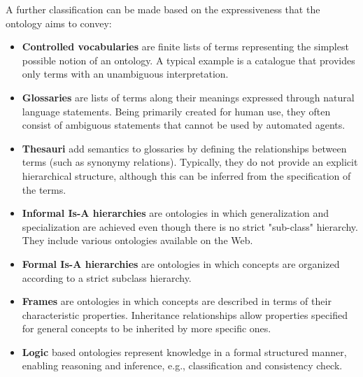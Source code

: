A further classification can be made based on the expressiveness that the ontology aims to convey:
\begin{itemize}
    \item \textbf{Controlled vocabularies} are finite lists of terms representing the simplest possible notion of an ontology. A typical example is a catalogue that provides only terms with an unambiguous interpretation.
    \item \textbf{Glossaries} are lists of terms along their meanings expressed through natural language statements. Being primarily created for human use, they often consist of ambiguous statements that cannot be used by automated agents.
    \item \textbf{Thesauri} add semantics to glossaries by defining the relationships between terms (such as synonymy relations). Typically, they do not provide an explicit hierarchical structure, although this can be inferred from the specification of the terms.
    \item \textbf{Informal Is-A hierarchies} are ontologies in which generalization and specialization are achieved even though there is no strict "sub-class" hierarchy. They include various ontologies available on the Web.
    \item \textbf{Formal Is-A hierarchies} are ontologies in which concepts are organized according to a strict subclass hierarchy.
    \item \textbf{Frames} are ontologies in which concepts are described in terms of their characteristic properties. Inheritance relationships allow properties specified for general concepts to be inherited by more specific ones.
   \item \textbf{Logic} based ontologies represent knowledge in a formal structured manner, enabling reasoning and inference, e.g., classification and consistency check.
\end{itemize}

